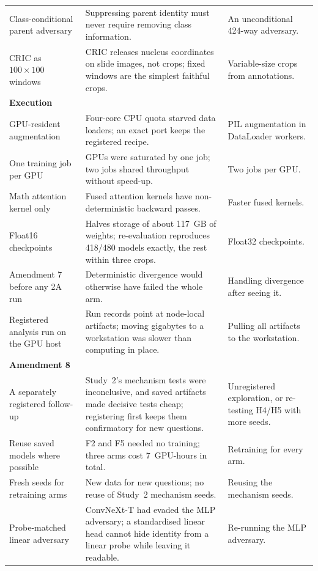 {\begin{longtable}{p{}p{}p{}}
Class-conditional parent adversary & Suppressing parent identity must never require removing class information. & An unconditional 424-way adversary. \\
CRIC as $100\times100$ windows & CRIC releases nucleus coordinates on slide images, not crops; fixed windows are the simplest faithful crops. & Variable-size crops from annotations. \\
\multicolumn{3}{l}{\textbf{Execution}} \\
GPU-resident augmentation & Four-core CPU quota starved data loaders; an exact port keeps the registered recipe. & PIL augmentation in DataLoader workers. \\
One training job per GPU & GPUs were saturated by one job; two jobs shared throughput without speed-up. & Two jobs per GPU. \\
Math attention kernel only & Fused attention kernels have non-deterministic backward passes. & Faster fused kernels. \\
Float16 checkpoints & Halves storage of about 117~GB of weights; re-evaluation reproduces 418/480 models exactly, the rest within three crops. & Float32 checkpoints. \\
Amendment 7 before any 2A run & Deterministic divergence would otherwise have failed the whole arm. & Handling divergence after seeing it. \\
Registered analysis run on the GPU host & Run records point at node-local artifacts; moving gigabytes to a workstation was slower than computing in place. & Pulling all artifacts to the workstation. \\
\multicolumn{3}{l}{\textbf{Amendment 8}} \\
A separately registered follow-up & Study~2's mechanism tests were inconclusive, and saved artifacts made decisive tests cheap; registering first keeps them confirmatory for new questions. & Unregistered exploration, or re-testing H4/H5 with more seeds. \\
Reuse saved models where possible & F2 and F5 needed no training; three arms cost 7~GPU-hours in total. & Retraining for every arm. \\
Fresh seeds for retraining arms & New data for new questions; no reuse of Study~2 mechanism seeds. & Reusing the mechanism seeds. \\
Probe-matched linear adversary & ConvNeXt-T had evaded the MLP adversary; a standardised linear head cannot hide identity from a linear probe while leaving it readable. & Re-running the MLP adversary. \\

\end{longtable}}

